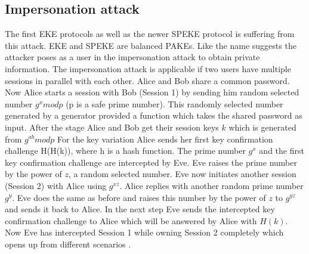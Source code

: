 \documentclass[journal]{IEEEtran}
\begin{document}
\subsection{Impersonation attack}
The first EKE protocols as well as the newer SPEKE protocol is suffering from this attack. 
EKE and SPEKE are balanced PAKEs.
Like the name suggests the attacker poses as a user in the impersonation attack to obtain private information. 
The impersonation attack is applicable if two users have multiple sessions in parallel with each other.
Alice and Bob share a common password. Now Alice starts a session with Bob (Session 1) by sending him random selected number $g^x mod p$ (p is a safe prime number).
This randomly selected number generated by a generator provided a function which takes the shared password as input.
After the stage Alice and Bob get their session keys $k$ which is generated from $g^{ab} mod p$ 
For the key variation Alice sends her first key confirmation challenge H(H(k)), where h is a hash function.
The prime number $g^x$ and the first key confirmation challenge are intercepted by Eve. Eve raises the prime number by the power of $z$, a random selected number.
Eve now initiates another session (Session 2) with Alice using $g^{xz}$. Alice replies with another random prime number $g^y$.
Eve does the same as before and raises this number by the power of $z$ to $g^{yz}$ and sends it back to Alice.
In the next step Eve sends the intercepted key confirmation challenge to Alice which will be answered by Alice with $H(k)$.
Now Eve has intercepted Session 1 while owning Session 2 completely which opens up from different scenarios \cite{hao2014speke}.
\end{document}

